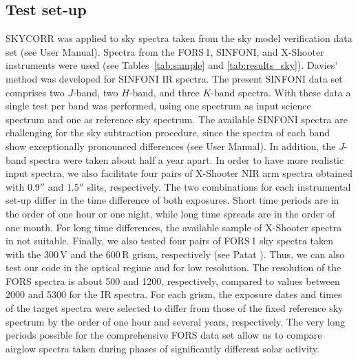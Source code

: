 \subsection{Test set-up}\label{sec:testsetup}
SKYCORR was applied to sky spectra taken from the sky model verification data
set (see \cite{SM01} User Manual). Spectra from the FORS\,1, SINFONI, and
X-Shooter instruments were used (see Tables~\ref{tab:sample} and
\ref{tab:results_sky}). Davies' \cite{DAV07} method was developed for SINFONI
IR spectra. The present SINFONI data set comprises two $J$-band, two $H$-band,
and three $K$-band spectra. With these data a single test per band was
performed, using one spectrum as input science spectrum and one as reference
sky spectrum. The available SINFONI spectra are challenging for the sky
subtraction procedure, since the spectra of each band show exceptionally
pronounced differences (see \cite{SM01} User Manual). In addition, the $J$-band
spectra were taken about half a year apart. In order to have more realistic
input spectra, we also facilitate four pairs of X-Shooter NIR arm spectra
obtained with $0.9''$ and $1.5''$ slits, respectively. The two combinations for
each instrumental set-up differ in the time difference of both exposures. Short
time periods are in the order of one hour or one night, while long time spreads
are in the order of one month. For long time differences, the available sample
of X-Shooter spectra in not suitable. Finally, we also tested four pairs of
FORS\,1 sky spectra taken with the 300\,V and the 600\,R grism, respectively
(see Patat \cite{PAT08}). Thus, we can also test our code in the optical regime
and for low resolution. The resolution of the FORS spectra is about 500 and
1200, respectively, compared to values between 2000 and 5300 for the IR
spectra. For each grism, the exposure dates and times of the target spectra
were selected to differ from those of the fixed reference sky spectrum by the
order of one hour and several years, respectively. The very long periods
possible for the comprehensive FORS data set allow us to compare airglow
spectra taken during phases of significantly different solar activity.

